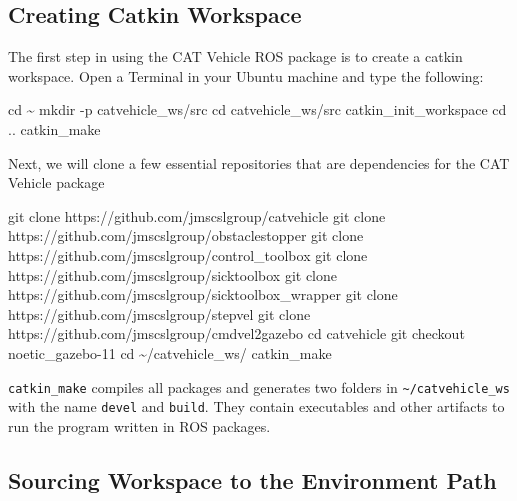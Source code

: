 \documentclass[
]{article}
\newenvironment{Shaded}{\begin{snugshade}}{\end{snugshade}}
\newcommand{\AttributeTok}[1]{\textcolor[rgb]{0.77,0.63,0.00}{#1}}
\newcommand{\BuiltInTok}[1]{#1}
\newcommand{\ExtensionTok}[1]{#1}
\newcommand{\FunctionTok}[1]{\textcolor[rgb]{0.00,0.00,0.00}{#1}}
\newcommand{\NormalTok}[1]{#1}
\begin{document}
\hypertarget{creating-catkin-workspace}{%
\subsection{Creating Catkin Workspace}\label{creating-catkin-workspace}}

The first step in using the CAT Vehicle ROS package is to create a
catkin workspace. Open a Terminal in your Ubuntu machine and type the
following:

\begin{Shaded}
\begin{Highlighting}[]
\BuiltInTok{cd}\NormalTok{ \textasciitilde{}}
\FunctionTok{mkdir} \AttributeTok{{-}p}\NormalTok{ catvehicle\_ws/src}
\BuiltInTok{cd}\NormalTok{ catvehicle\_ws/src}
\ExtensionTok{catkin\_init\_workspace}
\BuiltInTok{cd}\NormalTok{ ..}
\ExtensionTok{catkin\_make}
\end{Highlighting}
\end{Shaded}

Next, we will clone a few essential repositories that are dependencies
for the CAT Vehicle package

\begin{Shaded}
\begin{Highlighting}[]
\FunctionTok{git}\NormalTok{ clone https://github.com/jmscslgroup/catvehicle}
\FunctionTok{git}\NormalTok{ clone https://github.com/jmscslgroup/obstaclestopper}
\FunctionTok{git}\NormalTok{ clone https://github.com/jmscslgroup/control\_toolbox}
\FunctionTok{git}\NormalTok{ clone https://github.com/jmscslgroup/sicktoolbox}
\FunctionTok{git}\NormalTok{ clone https://github.com/jmscslgroup/sicktoolbox\_wrapper}
\FunctionTok{git}\NormalTok{ clone https://github.com/jmscslgroup/stepvel}
\FunctionTok{git}\NormalTok{ clone https://github.com/jmscslgroup/cmdvel2gazebo}
\BuiltInTok{cd}\NormalTok{ catvehicle}
\FunctionTok{git}\NormalTok{ checkout noetic\_gazebo{-}11}
\BuiltInTok{cd}\NormalTok{ \textasciitilde{}/catvehicle\_ws/}
\ExtensionTok{catkin\_make}
\end{Highlighting}
\end{Shaded}

\texttt{catkin\_make} compiles all packages and generates two folders in
\texttt{\textasciitilde{}/catvehicle\_ws} with the name \texttt{devel}
and \texttt{build}. They contain executables and other artifacts to run
the program written in ROS packages.

\hypertarget{sourcing-workspace-to-the-environment-path}{%
\subsection{Sourcing Workspace to the Environment
Path}\label{sourcing-workspace-to-the-environment-path}}
\end{document}
